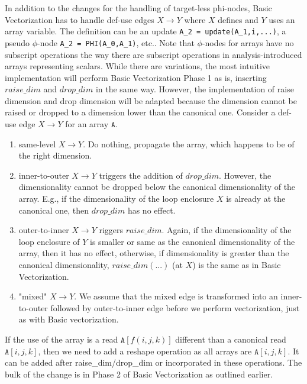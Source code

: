 \documentclass[sigconf, screen, natbib=false, dvipsnames, table]{acmart}
\theoremstyle{definition}
\begin{document}
In addition to the changes for the handling of target-less phi-nodes, Basic Vectorization has to handle def-use edges $X \rightarrow Y$ where $X$ defines and $Y$ uses an array variable. The definition can be an update \texttt{A\_2 = update(A\_1,i,...)}, a pseudo $\phi$-node \texttt{A\_2 = PHI(A\_0,A\_1)}, etc.. Note that $\phi$-nodes for arrays have no subscript operations the way there are subscript operations in analysis-introduced arrays representing scalars. While there are variations, the most intuitive implementation will perform Basic Vectorization Phase 1 as is, inserting 
$\mathit{raise\_dim}$ and $\mathit{drop\_dim}$ in the same way. However, the implementation of raise dimension and drop dimension will be adapted because the dimension cannot be raised or dropped to a dimension lower than the canonical one. Consider a def-use edge $X \rightarrow Y$ for an array $\texttt{A}$.

\begin{enumerate}

\item same-level $X \rightarrow Y$. Do nothing, propagate the array, which happens to be of the right dimension. 

\item inner-to-outer $X \rightarrow Y$ triggers the addition of $\mathit{drop\_dim}$. However, the dimensionality cannot be dropped below the canonical dimensionality of the array. E.g., if the dimensionality of the loop enclosure $X$ is already at the canonical one, then $\mathit{drop\_dim}$ has no effect.

\item outer-to-inner $X \rightarrow Y$ riggers  $\mathit{raise\_dim}$. Again, if the dimensionality of the loop enclosure of $Y$ is smaller or same as the canonical dimensionality of the array, then it has no effect, otherwise, if dimensionality is greater than the canonical dimensionality, $\mathit{raise\_dim(...)}$ (at $X$) is the same as in Basic Vectorization.

\item "mixed" $X \rightarrow Y$. We assume that the mixed edge is transformed into an inner-to-outer followed by outer-to-inner edge before we perform vectorization, just as with Basic vectorization.

\end{enumerate}

If the use of the array is a read $\texttt{A}[f(i,j,k)]$ different than a canonical read $\texttt{A}[i,j,k]$, then we need to add a reshape operation as 
all arrays are $\texttt{A}[i,j,k]$. It can be added after raise\_dim/drop\_dim or incorporated in these operations.
The bulk of the change is in Phase 2 of Basic Vectorization as outlined earlier.
\end{document}
